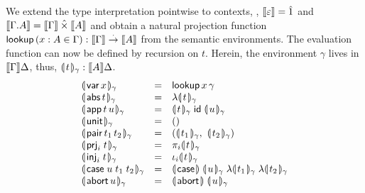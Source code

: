 \documentclass[sigplan,screen]{acmart}
\begin{document}
We extend the type interpretation pointwise to contexts, \ie,
$\den \cempty = \hatone$ and
$\den{\cext \Gamma A} = \den \Gamma \hattimes \den A$
and obtain a natural projection function
$\tlookup\,(x : A \in \Gamma) : \den \Gamma \todot \den A$
from the semantic environments.
The evaluation function
can now be defined by recursion on $t$.
Herein, the environment $\gamma$ lives in $\den \Gamma \Delta$, thus, $\dent t \gamma : \den A \Delta$.
\[
\begin{array}{lcl}
  \dent{\tvar\,x}\gamma & = & \tlookup\,x\,\gamma \\
  \dent{\tabs\,t}\gamma & = & \fdent t \gamma \\
  \dent{\tapp\,t\,u} \gamma & = &
     \dent t \gamma\;\tid\;\dent u \gamma \\
  \dent{\tunit}\gamma & = & \ttempty \\
  \dent{\tpair\,t_1\,t_2}\gamma & = &
    (\dent{t_1}\gamma,\ \dent{t_2}\gamma) \\
  \dent{\prj i t}\gamma & = & \pi_i \dent t \gamma \\
  \dent{\inj i t}\gamma & = & \iota_i \dent t \gamma \\
  \dent{\tcase\;u\;t_1\;t_2}\gamma & = &
     \dencase\;\dent u \gamma\;\fdent{t_1}\gamma\;\fdent{t_2}\gamma \\
  \dent{\tabort\,u}\gamma & = & \denabort\;\dent u \gamma \\
\end{array}
\]
\end{document}

